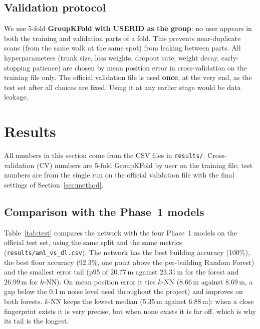 \documentclass[conference]{IEEEtran}
\begin{document}
\subsection{Validation protocol}

We use 5-fold \textbf{GroupKFold with USERID as the group}: no user appears in both the training
and validation parts of a fold. This prevents near-duplicate scans (from the same walk at the same
spot) from leaking between parts. All hyperparameters (trunk size, loss weights, dropout rate,
weight decay, early-stopping patience) are chosen by mean position error in cross-validation on
the training file only. The official validation file is used \textbf{once}, at the very end, as
the test set after all choices are fixed. Using it at any earlier stage would be data leakage.

\section{Results}
\label{sec:results}

All numbers in this section come from the CSV files in \texttt{results/}. Cross-validation (CV)
numbers are 5-fold GroupKFold by user on the training file; test numbers are from the single run
on the official validation file with the final settings of Section~\ref{sec:method}.

\subsection{Comparison with the Phase~1 models}

Table~\ref{tab:test} compares the network with the four Phase~1 models on the official test set,
using the same split and the same metrics (\texttt{results/aml\_vs\_dl.csv}). The network has the
best building accuracy (100\%), the best floor accuracy (92.3\%, one point above the per-building
Random Forest) and the smallest error tail (p95 of 20.77\,m against 23.31\,m for the forest and
26.99\,m for $k$-NN). On mean position error it ties $k$-NN (8.66\,m against 8.69\,m, a gap below
the 0.1\,m noise level used throughout the project) and improves on both forests. $k$-NN keeps the
lowest median (5.35\,m against 6.88\,m): when a close fingerprint exists it is very precise, but
when none exists it is far off, which is why its tail is the longest.
\end{document}
